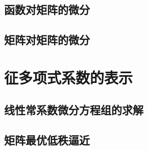 \subsection{函数对矩阵的微分}
\label{sub:函数对矩阵的微分}

\subsection{矩阵对矩阵的微分}
\label{sub:矩阵对矩阵的微分}

\section{征多项式系数的表示}
\label{sec:征多项式系数的表示}

\subsection{线性常系数微分方程组的求解}
\label{sub:线性常系数微分方程组的求解}

\subsection{矩阵最优低秩逼近}
\label{sub:矩阵最优低秩逼近}


